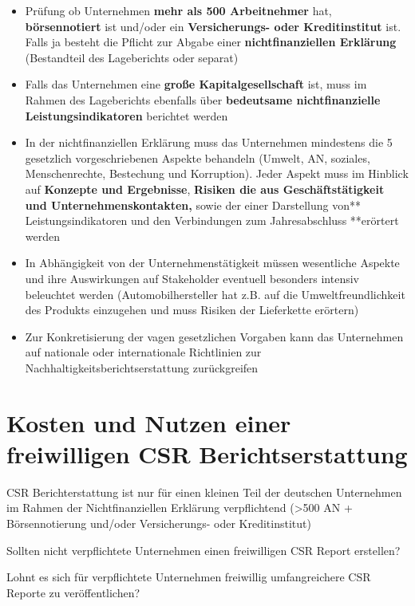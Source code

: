 \documentclass[
]{article}
\providecommand{\tightlist}{%
  \setlength{\itemsep}{0pt}\setlength{\parskip}{0pt}}
\begin{document}
\begin{itemize}
\tightlist
\item
  Prüfung ob Unternehmen \textbf{mehr als 500 Arbeitnehmer} hat,
  \textbf{börsennotiert} ist und/oder ein \textbf{Versicherungs- oder
  Kreditinstitut} ist. Falls ja besteht die Pflicht zur Abgabe einer
  \textbf{nichtfinanziellen Erklärung} (Bestandteil des Lageberichts
  oder separat)
\item
  Falls das Unternehmen eine \textbf{große Kapitalgesellschaft} ist,
  muss im Rahmen des Lageberichts ebenfalls über \textbf{bedeutsame
  nichtfinanzielle Leistungsindikatoren} berichtet werden
\item
  In der nichtfinanziellen Erklärung muss das Unternehmen mindestens die
  5 gesetzlich vorgeschriebenen Aspekte behandeln (Umwelt, AN, soziales,
  Menschenrechte, Bestechung und Korruption). Jeder Aspekt muss im
  Hinblick auf \textbf{Konzepte und Ergebnisse}, \textbf{Risiken die aus
  Geschäftstätigkeit und Unternehmenskontakten, }sowie der einer
  Darstellung von** Leistungsindikatoren und den Verbindungen zum
  Jahresabschluss **erörtert werden
\item
  In Abhängigkeit von der Unternehmenstätigkeit müssen wesentliche
  Aspekte und ihre Auswirkungen auf Stakeholder eventuell besonders
  intensiv beleuchtet werden (Automobilhersteller hat z.B. auf die
  Umweltfreundlichkeit des Produkts einzugehen und muss Risiken der
  Lieferkette erörtern)
\item
  Zur Konkretisierung der vagen gesetzlichen Vorgaben kann das
  Unternehmen auf nationale oder internationale Richtlinien zur
  Nachhaltigkeitsberichtserstattung zurückgreifen
\end{itemize}

\hypertarget{kosten-und-nutzen-einer-freiwilligen-csr-berichtserstattung}{%
\section{Kosten und Nutzen einer freiwilligen CSR
Berichtserstattung}\label{kosten-und-nutzen-einer-freiwilligen-csr-berichtserstattung}}

CSR Berichterstattung ist nur für einen kleinen Teil der deutschen
Unternehmen im Rahmen der Nichtfinanziellen Erklärung verpflichtend
(\textgreater500 AN + Börsennotierung und/oder Versicherungs- oder
Kreditinstitut)

Sollten nicht verpflichtete Unternehmen einen freiwilligen CSR Report
erstellen?

Lohnt es sich für verpflichtete Unternehmen freiwillig umfangreichere
CSR Reporte zu veröffentlichen?
\end{document}
